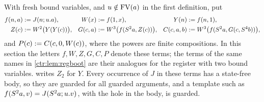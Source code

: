 With fresh bound variables, and $u\notin\operatorname{FV}(a)$ in the first definition, put
\begin{align*}
 f(n,a)&\mathrel{:=} J(n;u.a), & W(x)&\mathrel{:=} f(1,x), & Y(n)&\mathrel{:=} f(n,1),\\
 Z(c)&\mathrel{:=} W^2\bigl(Y(Y(c))\bigr), & G(c,a)&\mathrel{:=} W^3\bigl(f(S^2a,Z(c))\bigr), &
 C(c,a,b)&\mathrel{:=} W^3\bigl(f(S^2a,G(c,S^4b))\bigr),
\end{align*}
and $P(c)\mathrel{:=} C(c,0,W(c))$, where the powers are finite compositions. In this section the
letters $f,W,Z,G,C,P$ denote these terms; the terms of the same names in
\cref{ctr:lem:regboot} are their analogues for the register with two bound variables.
 writes $Z_2$ for $Y$. Every occurrence of $J$ in these terms has a
state-free body, so they are guarded for all guarded arguments, and a template such as
$f(S^2a,v)=J(S^2 a;u.v)$, with the hole in the body, is guarded.

